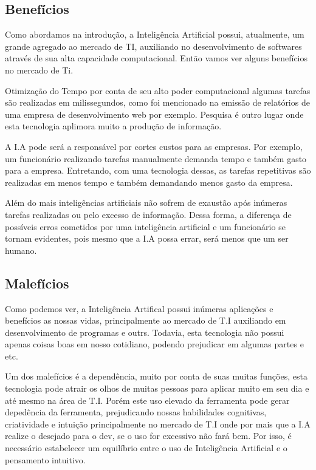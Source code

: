 \documentclass[12pt]{article}
\begin{document}
    \subsection{Benefícios}
        Como abordamos na introdução, a Inteligência Artificial possui, atualmente, um grande agregado ao mercado de TI, auxiliando no desenvolvimento de softwares através de sua alta capacidade computacional. Então vamos ver alguns benefícios no mercado de Ti.
        
        Otimização do Tempo por conta de seu alto poder computacional algumas tarefas são realizadas em milissegundos, como foi mencionado na emissão de relatórios de uma empresa de desenvolvimento web por exemplo. Pesquisa é outro lugar onde esta tecnologia aplimora muito a produção de informação.
            
        A I.A pode será a responsável por cortes custos para as empresas. Por exemplo, um funcionário realizando tarefas manualmente demanda tempo e  também gasto para a empresa. Entretando, com uma tecnologia dessas, as tarefas repetitivas são realizadas em menos tempo e também demandando menos gasto da empresa.
            
        Além do mais inteligências artificiais não sofrem de exaustão após inúmeras tarefas realizadas ou pelo excesso de informação. Dessa forma, a diferença de possíveis erros cometidos por uma inteligência artificial e um funcionário se tornam evidentes, pois mesmo que a I.A possa errar, será menos que um ser humano.

    \subsection{Malefícios}
        Como podemos ver, a Inteligência Artifical possui inúmeras aplicações e benefícios as nossas vidas, principalmente ao mercado de T.I auxiliando em desenvolvimento de programas e outrs. Todavia, esta tecnologia não possui apenas coisas boas em nosso cotidiano, podendo prejudicar em algumas partes e etc. 

        Um dos malefícios é a dependência, muito por conta de suas muitas funções, esta tecnologia pode atrair os olhos de muitas pessoas para aplicar muito em seu dia e até mesmo na área de T.I. Porém este uso elevado da ferramenta pode gerar depedência da ferramenta, prejudicando nossas habilidades cognitivas, criatividade e intuição principalmente no mercado de T.I onde por mais que a I.A realize o desejado para o dev, se o uso for excessivo não fará bem. Por isso, é necessário estabelecer um equilíbrio entre o uso de Inteligência Artificial e o pensamento intuitivo.
\end{document}
